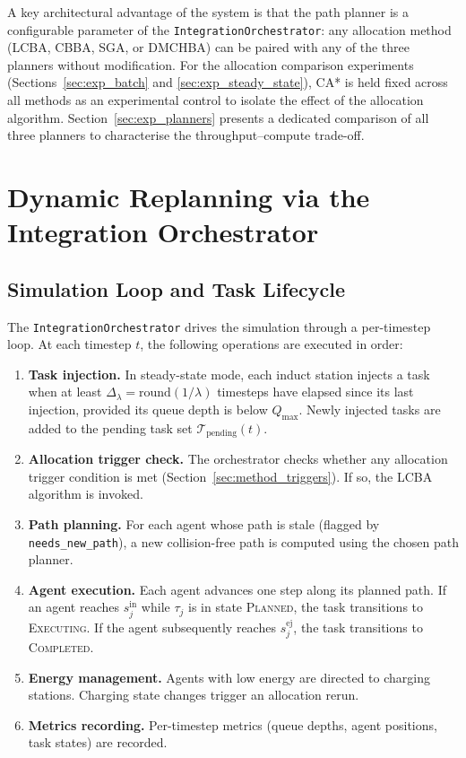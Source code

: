 A key architectural advantage of the system is that the path planner is a
configurable parameter of the \texttt{IntegrationOrchestrator}: any allocation
method (LCBA, CBBA, SGA, or DMCHBA) can be paired with any of the three
planners without modification.
For the allocation comparison experiments (Sections~\ref{sec:exp_batch} and
\ref{sec:exp_steady_state}), CA* is held fixed across all methods as an
experimental control to isolate the effect of the allocation algorithm.
Section~\ref{sec:exp_planners} presents a dedicated comparison of all three
planners to characterise the throughput--compute trade-off.


\section{Dynamic Replanning via the Integration Orchestrator}
\label{sec:method_dynamic}


\subsection{Simulation Loop and Task Lifecycle}
\label{subsec:method_loop}

The \texttt{IntegrationOrchestrator} drives the simulation through a
per-timestep loop.
At each timestep $t$, the following operations are executed in order:
\begin{enumerate}
  \item \textbf{Task injection.}
        In steady-state mode, each induct station injects a task when at least
        $\Delta_{\lambda} = \text{round}(1/\lambda)$ timesteps have elapsed
        since its last injection, provided its queue depth is below $Q_{\max}$.
        Newly injected tasks are added to the pending task set
        $\mathcal{T}_{\text{pending}}(t)$.
  \item \textbf{Allocation trigger check.}
        The orchestrator checks whether any allocation trigger condition is
        met (Section~\ref{sec:method_triggers}).
        If so, the LCBA algorithm is invoked.
  \item \textbf{Path planning.}
        For each agent whose path is stale (flagged by
        \texttt{needs\_new\_path}), a new collision-free path is computed
        using the chosen path planner.
  \item \textbf{Agent execution.}
        Each agent advances one step along its planned path.
        If an agent reaches $s_j^{\text{in}}$ while $\tau_j$ is in
        state \textsc{Planned}, the task transitions to
        \textsc{Executing}.
        If the agent subsequently reaches $s_j^{\text{ej}}$, the task
        transitions to \textsc{Completed}.
  \item \textbf{Energy management.}
        Agents with low energy are directed to charging stations.
        Charging state changes trigger an allocation rerun.
  \item \textbf{Metrics recording.}
        Per-timestep metrics (queue depths, agent positions, task states)
        are recorded.
\end{enumerate}

